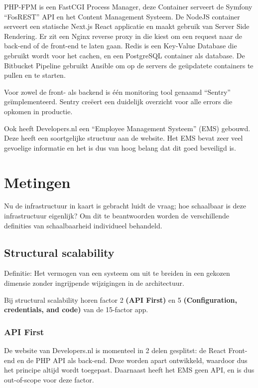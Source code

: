 PHP-FPM is een FastCGI Process Manager, deze Container serveert de Symfony “FosREST” API en het Content Management Systeem. De NodeJS container serveert een statische Next.js React applicatie en maakt gebruik van Server Side Rendering. Er zit een Nginx reverse proxy in die kiest om een request naar de back-end of de front-end te laten gaan. Redis is een Key-Value Database die gebruikt wordt voor het cachen, en een PostgreSQL container als database. De Bitbucket Pipeline gebruikt Ansible om op de servers de geüpdatete containers te pullen en te starten.

Voor zowel de front- als backend is één monitoring tool genaamd \enquote{Sentry} geïmplementeerd. Sentry creëert een duidelijk overzicht voor alle errors die opkomen in productie.

Ook heeft Developers.nl een \enquote{Employee Management Systeem} (EMS) gebouwd. Deze heeft een soortgelijke structuur aan de website. Het EMS bevat zeer veel gevoelige informatie en het is dus van hoog belang dat dit goed beveiligd is.

\section{Metingen}

Nu de infrastructuur in kaart is gebracht luidt de vraag; hoe schaalbaar is deze infrastructuur eigenlijk? Om dit te beantwoorden worden de verschillende definities van schaalbaarheid individueel behandeld.

\subsection{Structural scalability}
Definitie: Het vermogen van een systeem om uit te breiden in een gekozen dimensie zonder ingrijpende wijzigingen in de architectuur.

Bij structural scalability horen factor 2 \textbf{(API First)} en 5 \textbf{(Configuration, credentials, and code)} van de 15-factor app. 

\subsubsection{API First}
De website van Developers.nl is momenteel in 2 delen gesplitst: de React Front-end en de PHP API als back-end. Deze worden apart ontwikkeld, waardoor dus het principe altijd wordt toegepast. Daarnaast heeft het EMS geen API, en is dus out-of-scope voor deze factor.


